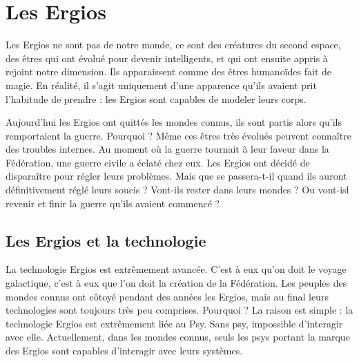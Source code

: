
\chapter{Les Ergios}

\begin{multicols}{2}

Les Ergios ne sont pas de notre monde, ce sont des créatures du second espace, des êtres qui ont évolué pour devenir intelligents, et qui ont ensuite appris à rejoint notre dimension. Ils apparaissent comme des êtres humanoïdes fait de magie. En réalité, il s'agit uniquement d'une apparence qu'ils avaient prit l'habitude de prendre : les Ergios sont capables de modeler leurs corps.

Aujourd’hui les Ergios ont quittés les mondes connus, ils sont partis alors qu'ils remportaient la guerre. Pourquoi ? Même ces êtres très évolués peuvent connaître des troubles internes. Au moment où la guerre tournait à leur faveur dans la Fédération, une guerre civile a éclaté chez eux. Les Ergios ont décidé de disparaître pour régler leurs problèmes. Mais que se passera-t-il quand ils auront définitivement réglé leurs soucis ? Vont-ils rester dans leurs mondes ? Ou vont-isl revenir et finir la guerre qu'ils avaient commencé ?

\section{Les Ergios et la technologie}

La technologie Ergios est extrêmement avancée. C'est à eux qu'on doit le voyage galactique, c'est à eux que l'on doit la création de la Fédération. Les peuples des mondes connus ont côtoyé pendant des années les Ergios, mais au final leurs technologies sont toujours très peu comprises. Pourquoi ? La raison est simple : la technologie Ergios est extrêmement liée au Psy. Sans psy, impossible d'interagir avec elle. Actuellement, dans les mondes connus, seuls les psys portant la marque des Ergios sont capables d'interagir avec leurs systèmes.

\end{multicols}

